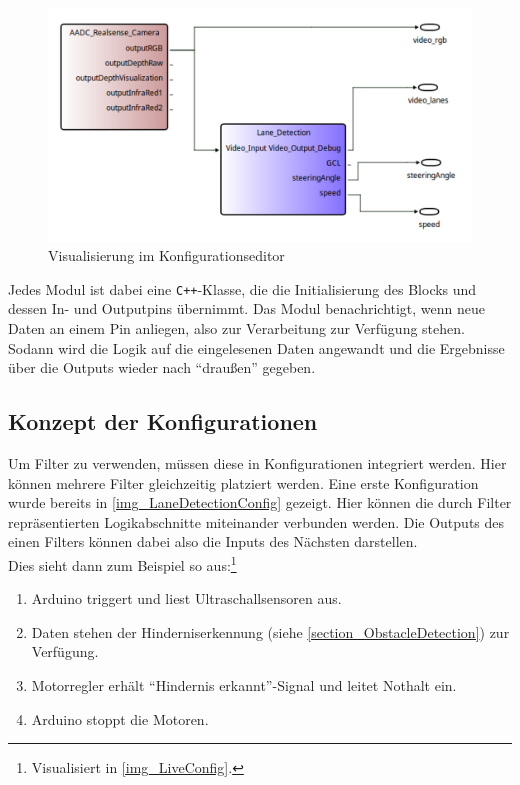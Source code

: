 \documentclass[a4paper,12pt]{report}
\begin{document}
	\begin{figure}[ht]
		\centering
		\includegraphics[width=\textwidth, height=\textheight, keepaspectratio]{assets/LaneDetectionConfig}
		\caption{Visualisierung im Konfigurationseditor}
		\label{img_LaneDetectionConfig}
	\end{figure}
	
	Jedes Modul ist dabei eine \texttt{C++}-Klasse, die die Initialisierung des Blocks und dessen In- und Outputpins übernimmt.
	Das Modul benachrichtigt, wenn neue Daten an einem Pin anliegen, also zur Verarbeitung zur Verfügung stehen.
	Sodann wird die Logik auf die eingelesenen Daten angewandt und die Ergebnisse über die Outputs wieder nach ``draußen'' gegeben.
	
	
\subsection{Konzept der Konfigurationen}
	
	Um Filter zu verwenden, müssen diese in Konfigurationen integriert werden.
	Hier können mehrere Filter gleichzeitig platziert werden.
	Eine erste Konfiguration wurde bereits in \autoref{img_LaneDetectionConfig} gezeigt.
	Hier können die durch Filter repräsentierten Logikabschnitte miteinander verbunden werden.
	Die Outputs des einen Filters können dabei also die Inputs des Nächsten darstellen.
	\\
	Dies sieht dann zum Beispiel so aus:\footnote{Visualisiert in \autoref{img_LiveConfig}.}
	\begin{enumerate}
		\item Arduino triggert und liest Ultraschallsensoren aus.
		\item Daten stehen der Hinderniserkennung (siehe \autoref{section_ObstacleDetection}) zur Verfügung.
		\item Motorregler erhält ``Hindernis erkannt''-Signal und leitet Nothalt ein.
		\item Arduino stoppt die Motoren.
	\end{enumerate}
	
\end{document}
